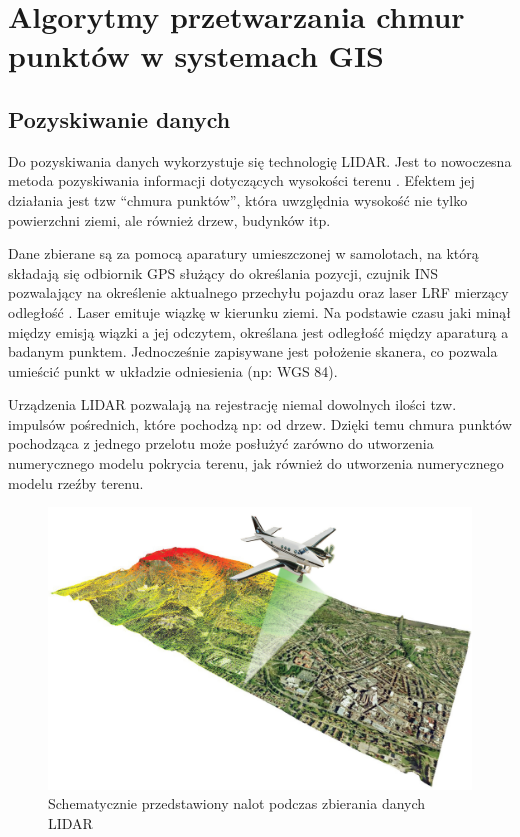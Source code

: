 \chapter{Algorytmy przetwarzania chmur punktów w systemach GIS}

\section{Pozyskiwanie danych}
Do pozyskiwania danych wykorzystuje się technologię LIDAR. Jest to nowoczesna metoda pozyskiwania informacji dotyczących wysokości terenu \cite{Marmol2003}. Efektem jej działania jest tzw “chmura punktów”, która uwzględnia wysokość nie tylko powierzchni ziemi, ale również drzew, budynków itp.

Dane zbierane są za pomocą aparatury umieszczonej w samolotach, na którą składają się odbiornik GPS służący do określania pozycji, czujnik INS pozwalający na określenie aktualnego przechyłu pojazdu oraz laser LRF mierzący odległość \cite{WBPW2012}. Laser emituje wiązkę w kierunku ziemi. Na podstawie czasu jaki minął między emisją wiązki a jej odczytem, określana jest odległość między aparaturą a badanym punktem. Jednocześnie zapisywane jest położenie skanera, co pozwala umieścić punkt w układzie odniesienia (np: WGS 84).

Urządzenia LIDAR pozwalają na rejestrację niemal dowolnych ilości tzw. impulsów pośrednich, które pochodzą np: od drzew. Dzięki temu chmura punktów pochodząca z jednego przelotu może posłużyć zarówno do utworzenia numerycznego modelu pokrycia terenu, jak również do utworzenia numerycznego modelu rzeźby terenu.

\begin{figure}[h!]
\centering
\includegraphics[width=1\textwidth]{img/LIDAR.jpg}
\caption{Schematycznie przedstawiony nalot podczas zbierania danych LIDAR}
\label{fig:lidar}
\end{figure}

